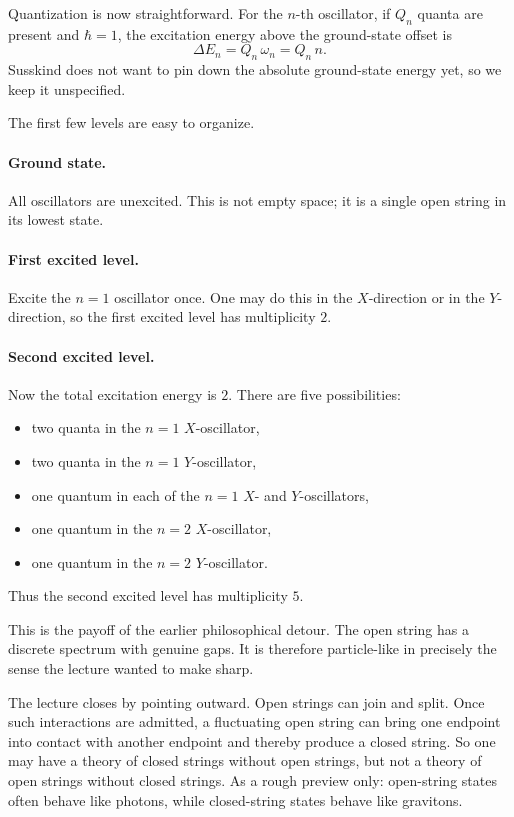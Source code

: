 Quantization is now straightforward. For the \(n\)-th oscillator, if \(Q_n\) quanta are present and \(\hbar=1\), the excitation energy above the ground-state offset is
\begin{equation}
\Delta E_n = Q_n\,\omega_n = Q_n\,n.
\end{equation}
Susskind does not want to pin down the absolute ground-state energy yet, so we keep it unspecified.

The first few levels are easy to organize.

\paragraph{Ground state.}
All oscillators are unexcited. This is not empty space; it is a single open string in its lowest state.

\paragraph{First excited level.}
Excite the \(n=1\) oscillator once. One may do this in the \(X\)-direction or in the \(Y\)-direction, so the first excited level has multiplicity \(2\).

\paragraph{Second excited level.}
Now the total excitation energy is \(2\). There are five possibilities:
\begin{itemize}
\item two quanta in the \(n=1\) \(X\)-oscillator,
\item two quanta in the \(n=1\) \(Y\)-oscillator,
\item one quantum in each of the \(n=1\) \(X\)- and \(Y\)-oscillators,
\item one quantum in the \(n=2\) \(X\)-oscillator,
\item one quantum in the \(n=2\) \(Y\)-oscillator.
\end{itemize}
Thus the second excited level has multiplicity \(5\).

This is the payoff of the earlier philosophical detour. The open string has a discrete spectrum with genuine gaps. It is therefore particle-like in precisely the sense the lecture wanted to make sharp.

The lecture closes by pointing outward. Open strings can join and split. Once such interactions are admitted, a fluctuating open string can bring one endpoint into contact with another endpoint and thereby produce a closed string. So one may have a theory of closed strings without open strings, but not a theory of open strings without closed strings. As a rough preview only: open-string states often behave like photons, while closed-string states behave like gravitons.

